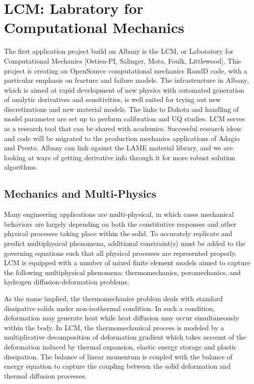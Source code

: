 \documentclass[pdf,12pt,report,strict]{SANDreport}
\theoremstyle{remark}
\begin{document}
\section{LCM: Labratory for Computational Mechanics}

The first application project build on Albany is the LCM, or
Laboratory for Computational Mechanics [Ostien-PI, Salinger, Mota,
  Foulk, Littlewood]. This project is creating an OpenSource
computational mechanics RandD code, with a particular emphasis on
fracture and failure models. The infrastructure in Albany, which is
aimed at rapid development of new physics with automated generation of
analytic derivatives and sensitivities, is well suited for trying out
new discretizations and new material models. The links to Dakota and
handling of model parameter are set up to perform calibration and UQ
studies. LCM serves as a research tool that can be shared with
academics. Successful research ideas and code will be migrated to the
production mechanics applications of Adagio and Presto. Albany can
link against the LAME material library, and we are looking at ways of
getting derivative info through it for more robust solution
algorithms.  


\subsection{Mechanics and Multi-Physics}
Many engineering applications are multi-physical, in which cases 
mechanical behaviors are largely depending on both 
the constitutive responses and other physical processes taking 
place within the solid. To accurately replicate and predict multiphysical 
phenomena, additional constraint(s) must be added to the governing equations
 such that all physical processes are represented properly. 
LCM is equipped with a number of mixed finite element models aimed to capture
the following multiphysical phenomena: thermomechanics, poromechanics, and hydrogen diffusion-deformation problems. 

As the name implied, the thermomechanics problem deals with standard dissipative
 solids under non-isothermal condition. In such a condition, deformation may
  generate heat while heat diffusion may occur simultaneously within the body. 
In LCM, the thermomechanical process is modeled by a multiplicative decomposition 
of deformation gradient which takes account of the deformation induced by thermal
 expansion, elastic energy storage and plastic dissipation. The balance of 
linear momentum is coupled with the balance of energy equation to capture the
 coupling between the solid deformation and thermal diffusion processes. 
\end{document}
